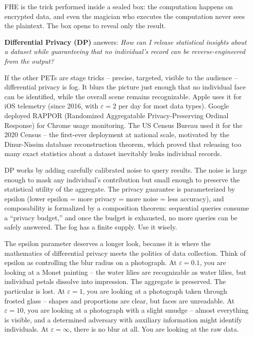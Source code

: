 \documentclass[
  11pt,
  openany]{report}
\renewcommand{\textbf}[1]{{\bfseries\color{MidnightBold}#1}}
\begin{document}
FHE is the trick performed inside a sealed box: the computation happens on
encrypted data, and even the magician who executes the computation never sees
the plaintext. The box opens to reveal only the result.

\textbf{Differential Privacy (DP)} answers: \emph{How can I release statistical
insights about a dataset while guaranteeing that no individual's record can be
reverse-engineered from the output?}

If the other PETs are stage tricks -- precise, targeted, visible to the audience
-- differential privacy is fog. It blurs the picture just enough that no
individual face can be identified, while the overall scene remains recognizable.
Apple uses it for iOS telemetry (since 2016, with \(\varepsilon = 2\) per day
for most data types). Google deployed RAPPOR (Randomized Aggregatable
Privacy-Preserving Ordinal Response) for Chrome usage monitoring. The US Census
Bureau used it for the 2020 Census -- the first-ever deployment at national
scale, motivated by the Dinur-Nissim database reconstruction theorem, which
proved that releasing too many exact statistics about a dataset inevitably leaks
individual records.

DP works by adding carefully calibrated noise to query results. The noise is
large enough to mask any individual's contribution but small enough to preserve
the statistical utility of the aggregate. The privacy guarantee is parameterized
by epsilon (lower epsilon = more privacy = more noise = less accuracy), and
composability is formalized by a composition theorem: sequential queries consume
a ``privacy budget,'' and once the budget is exhausted, no more queries can be
safely answered. The fog has a finite supply. Use it wisely.

The epsilon parameter deserves a longer look, because it is where the
mathematics of differential privacy meets the politics of data collection. Think
of epsilon as controlling the blur radius on a photograph. At
\(\varepsilon = 0.1\), you are looking at a Monet painting -- the water lilies
are recognizable as water lilies, but individual petals dissolve into
impression. The aggregate is preserved. The particular is lost. At
\(\varepsilon = 1\), you are looking at a photograph taken through frosted glass
-- shapes and proportions are clear, but faces are unreadable. At
\(\varepsilon = 10\), you are looking at a photograph with a slight smudge --
almost everything is visible, and a determined adversary with auxiliary
information might identify individuals. At \(\varepsilon = \infty\), there is no
blur at all. You are looking at the raw data.
\end{document}
